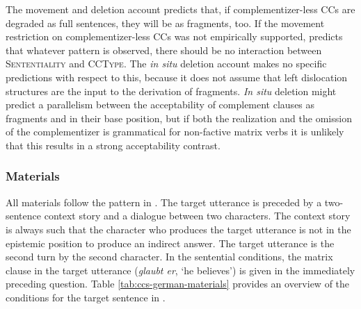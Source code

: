 The movement and deletion account predicts that, if complementizer-less CCs are degraded as full sentences, they will be as fragments, too. If the movement restriction on complementizer-less CCs was not empirically supported, \citet{merchant2004} predicts that whatever pattern is observed, there should be no interaction between \textsc{Sententiality} and \textsc{CCType}. The \textit{in situ} deletion account makes no specific predictions with respect to this, because it does not assume that left dislocation structures are the input to the derivation of fragments. \textit{In situ} deletion might predict a parallelism between the acceptability of complement clauses as fragments and in their base position, but if both the realization and the omission of the complementizer is grammatical for non-factive matrix verbs it is unlikely that this results in a strong acceptability contrast.

\subsubsection{Materials}\label{sec:ccs-materials}
All materials follow the pattern in \Last. The target utterance is preceded by a two-sentence context story and a dialogue between two characters. The context story is always such that the character who produces the target utterance is not in the epistemic position to produce an indirect answer. The target utterance is the second turn by the second character. In the sentential conditions, the matrix clause in the target utterance (\textit{glaubt er}, `he believes') is given in the immediately preceding question. Table \ref{tab:ccs-german-materials} provides an overview of the conditions for the target sentence in \Last.

